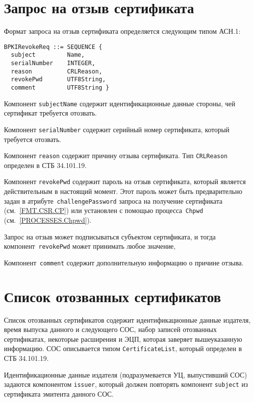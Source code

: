\section{Запрос на отзыв сертификата}\label{FMT.BPKIRevokeReq}

Формат запроса на отзыв сертификата определяется следующим типом АСН.1:
\begin{verbatim}
BPKIRevokeReq ::= SEQUENCE {
  subject         Name,
  serialNumber    INTEGER,
  reason          CRLReason,
  revokePwd       UTF8String,
  comment         UTF8String }
\end{verbatim}

Компонент \texttt{subjectName} содержит идентификационные 
данные стороны, чей сертификат требуется отозвать. 

Компонент \texttt{serialNumber} содержит серийный номер 
сертификата, который требуется отозвать.

Компонент \texttt{reason} содержит причину отзыва сертификата. 
Тип \texttt{CRLReason} определен в СТБ 34.101.19.

Компонент \texttt{revokePwd} содержит пароль на отзыв 
сертификата, который является действительным в 
настоящий момент. Этот пароль может быть предварительно
задан в атрибуте~\texttt{challengePassword} запроса на получение сертификата 
(см.~\ref{FMT.CSR.CP}) или установлен с помощью процесса~\texttt{Chpwd} 
(см.~\ref{PROCESSES.Chpwd}). 

Запрос на отзыв может подписываться субъектом сертификата,
и тогда компонент~\texttt{revokePwd} может принимать любое значение,

Компонент~\texttt{comment} содержит дополнительную информацию 
о причине отзыва.
 
\section{Список отозванных сертификатов}\label{FMT.CRL}

Список отозванных сертификатов содержит идентификационные данные 
издателя, время выпуска данного и следующего СОС, набор 
записей отозванных сертификатах, некоторые расширения и ЭЦП, 
которая заверяет вышеуказанную информацию. СОС описывается типом 
\texttt{CertificateList}, который определен в СТБ 34.101.19.
 
Идентификационные данные издателя (подразумевается УЦ, 
выпустивший СОС) задаются компонентом \texttt{issuer}, 
который должен повторять компонент \texttt{subject} из 
сертификата эмитента данного СОС.  

